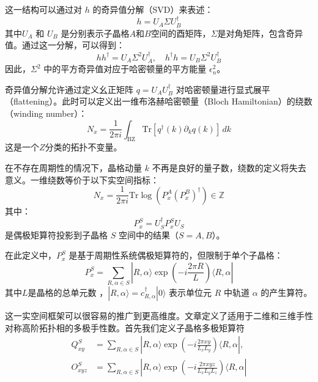 这一结构可以通过对 \( h \) 的奇异值分解（SVD）来表述：
\begin{equation}
h = U_A \Sigma U_B^\dagger
\end{equation}
其中$U_A$ 和 $U_B$ 是分别表示子晶格$A$和$B$空间的酉矩阵，$\Sigma$是对角矩阵，包含奇异值。通过这一分解，可以得到：
\begin{equation}
h h^\dagger = U_A \Sigma^2 U_A^\dagger, \quad h^\dagger h = U_B \Sigma^2 U_B^\dagger
\end{equation}
因此，\(\Sigma^2\) 中的平方奇异值对应于哈密顿量的平方能量 \( \epsilon_n^2 \)。

奇异值分解允许通过定义幺正矩阵 \( q= U_A U_B^\dagger \) 对哈密顿量进行显式展平（flattening）。此时可以定义出一维布洛赫哈密顿量（Bloch Hamiltonian）的绕数（winding number）：
\begin{equation}
N_x = \frac{1}{2\pi i} \int_{\text{BZ}} \mathrm{Tr} \left[ q^\dagger(k) \partial_k q(k) \right] \, dk
\end{equation}
这是一个$Z$分类的拓扑不变量。

在不存在周期性的情况下，晶格动量 \( k \) 不再是良好的量子数，绕数的定义将失去意义。一维绕数等价于以下实空间指标：
\begin{equation}
N_x = \frac{1}{2\pi i} \mathrm{Tr} \log \left( P_x^A (P_x^B)^\dagger \right) \in \mathbb{Z}
\end{equation}
其中：
\begin{equation}
P_x^S = U_S^\dagger P_x^S U_S
\end{equation}
是偶极矩算符投影到子晶格 \( S \) 空间中的结果（\( S = A, B \)）。

在此定义中，\( P_x^S \) 是基于周期性系统偶极矩算符的，但限制于单个子晶格：
\begin{equation}
P_x^S = \sum_{R, \alpha \in S} |R, \alpha \rangle \exp\left( -i \frac{2\pi R}{L} \right) \langle R, \alpha |
\end{equation}
其中\( L \)是晶格的总单元数 ，\( |R, \alpha \rangle = c_{R,\alpha}^\dagger |0\rangle \) 表示单位元 \( R \) 中轨道 \( \alpha \) 的产生算符。

这一实空间框架可以很容易的推广到更高维度。文章定义了适用于二维和三维手性对称高阶拓扑相的多极手性数。首先我们定义子晶格多极矩算符
\begin{equation}
\begin{aligned}
Q_{xy}^S &= \sum_{R, \alpha \in S} |R, \alpha \rangle \exp \left( -i \frac{2\pi xy}{L_x L_y} \right) \langle R, \alpha |, \\
O_{xyz}^S &= \sum_{R, \alpha \in S} |R, \alpha \rangle \exp \left( -i \frac{2\pi xyz}{L_x L_y L_z} \right) \langle R, \alpha |
\end{aligned}
\end{equation}

